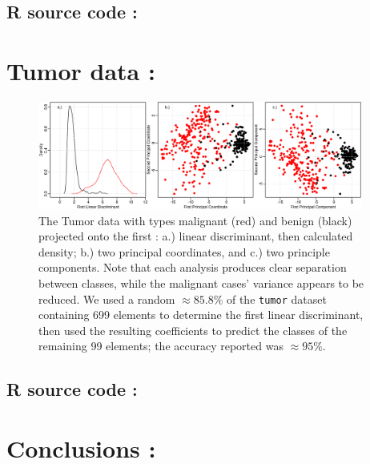 \subsection{R source code :}

\begin{multicols}{2}


\end{multicols}

\newpage

\section{Tumor data :}

\begin{figure}[H]
  \centering
    \includegraphics[width=0.95\textwidth]{images/tumor.png}
  \caption{The Tumor data with types malignant (red) and benign (black) projected onto the first :  a.) linear discriminant, then calculated density; b.) two principal coordinates, and c.) two principle components.  Note that each analysis produces clear separation between classes, while the malignant cases' variance appears to be reduced.  We used a random $\approx 85.8\%$ of the \texttt{tumor} dataset containing 699 elements to determine the first linear discriminant, then used the resulting coefficients to predict the classes of the remaining 99 elements; the accuracy reported was $\approx 95\%$.}
\end{figure}

\subsection{R source code :}

\begin{multicols}{2}


\end{multicols}

\section{Conclusions :}

